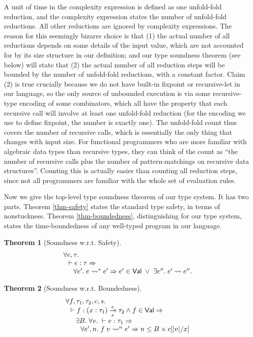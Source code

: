 \documentclass[preprint]{sigplanconf}
\newcommand{\arrow}[4]{#1\xrightarrow[#3]{#2}#4}
\newtheorem{thm}{Theorem}
\begin{document}
A unit of time in the complexity expression is defined as one unfold-fold reduction, and the complexity expression states the number of unfold-fold reductions. All other reductions are ignored by complexity expressions. The reason for this seemingly bizarre choice is that (1) the actual number of all reductions depends on some details of the input value, which are not accounted for by its size structure in our definition; and our type soundness theorem (see below) will state that (2) the actual number of all reduction steps will be bounded by the number of unfold-fold reductions, with a constant factor. Claim (2) is true crucially because we do not have built-in fixpoint or recursive-let in our language, so the only source of unbounded execution is via some recursive-type encoding of some combinators, which all have the property that each recursive call will involve at least one unfold-fold reduction (for the encoding we use to define fixpoint, the number is exactly one). The unfold-fold count thus covers the number of recursive calls, which is essentially the only thing that changes with input size. For functional programmers who are more familiar with algebraic data types than recursive types, they can think of the count as ``the number of recursive calls plus the number of pattern-matchings on recursive data structures''. Counting this is actually easier than counting all reduction steps, since not all programmers are familiar with the whole set of evaluation rules. 

Now we give the top-level type soundness theorem of our type system. It has two parts. Theorem \ref{thm-safety} states the standard type safety, in terms of nonstuckness. Theorem \ref{thm-boundedness}, distinguishing for our type system, states the time-boundedness of any well-typed program in our language.

\begin{thm}[\label{thm-safety}Soundness w.r.t. Safety]
$$
\begin{array}{l}
\forall e,\tau. \\
\hspace{.1in} \vdash e:\tau \Rightarrow \\
\hspace{.2in} \forall e'.\; e \leadsto^* e' \Rightarrow e'\in\mathsf{Val} \;\vee\; \exists e''.\;e' \leadsto e''.
\end{array}
$$
\end{thm}

\begin{thm}[\label{thm-boundedness}Soundness w.r.t. Boundedness]
$$
\begin{array}{l}
\forall f,\tau_1,\tau_2,c,s. \\
\hspace{0.1in} \vdash f:\arrow{(x:\tau_1)}{c}{s}{\tau_2} \wedge f\in\mathsf{Val}\Rightarrow \\
\hspace{0.2in} \exists B. \;\forall v.\; \vdash v:\tau_1 \Rightarrow \\
\hspace{0.3in} \forall e',n.\; f\;v\leadsto^n e' \Rightarrow n\leq B\times c[|v|/x]
\end{array}
$$
\end{thm}
\end{document}
